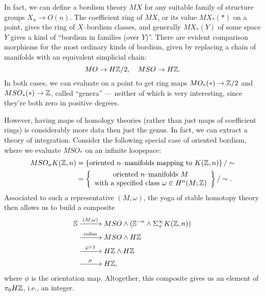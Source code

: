  In fact, we can define a bordism theory $MX$ for any suitable family of structure groups $X_n \to O(n)$.  The coefficient ring of $MX$, or its value $MX_*(*)$ on a point, gives the ring of $X$--bordism classes, and generally $MX_*(Y)$ of some space $Y$ gives a kind of ``bordism in families (over $Y$)''.  There are evident comparison morphisms for the most ordinary kinds of bordism, given by replacing a chain of manifolds with an equivalent simplicial chain: \[MO \to H\mathbb Z/2, \quad MSO \to H\mathbb Z.\] In both cases, we can evaluate on a point to get ring maps $MO_*(*) \to \mathbb Z/2$ and $MSO_*(*) \to \mathbb Z$, called ``genera'' --- neither of which is very interesting, since they're both zero in positive degrees.

However, having maps of homology theories (rather than just maps of coefficient rings) is considerably more data then just the genus.  In fact, we can extract a theory of integration.  Consider the following special case of oriented bordism, where we evaluate $MSO_*$ on an infinite loopspace:
\begin{align*}
MSO_n K(\mathbb Z, n) & = \left\{ \text{oriented $n$--manifolds mapping to $K(\mathbb Z, n)$} \right\} / \sim \\
& = \left\{ \begin{array}{c}\text{oriented $n$--manifolds $M$} \\ \text{with a specified class $\omega \in H^n(M; \mathbb Z)$} \end{array}\right\} / \sim.
\end{align*}
Associated to such a representative $(M, \omega)$, the yoga of stable homotopy theory then allows us to build a composite
\begin{align*}
\S & \xrightarrow{\mathmakebox[2.5em]{(M, \omega)}} MSO \sm (\S^{-n} \sm \Susp^\infty_+ K(\Z, n)) \\ 
& \xrightarrow{\mathmakebox[2.5em]{\colim}} MSO \sm H\Z \\
& \xrightarrow{\mathmakebox[2.5em]{\phi \sm 1}} H\Z \sm H\Z \\
& \xrightarrow{\mathmakebox[2.5em]{\mu}} H\Z,
\end{align*}
where $\phi$ is the orientation map.  Altogether, this composite gives us an element of $\pi_0 H\mathbb Z$, i.e., an integer.

